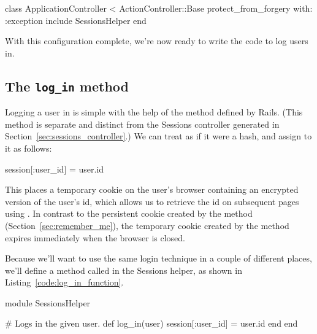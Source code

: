 \begin{codelisting}
\label{code:sessions_helper_include}
\begin{code}
class ApplicationController < ActionController::Base
  protect_from_forgery with: :exception
  include SessionsHelper
end
\end{code}
\end{codelisting}

\noindent With this configuration complete, we're now ready to write the code to log users in.


    \subsection{The \texttt{log\_in} method} %
    \label{sec:a_working_log_in_method}

Logging a user in is simple with the help of the  method defined by Rails. (This method is separate and distinct from the Sessions controller generated in Section~\ref{sec:sessions_controller}.) We can treat  as if it were a hash, and assign to it as follows:

\begin{code}
session[:user_id] = user.id
\end{code}

\noindent This places a temporary cookie on the user's browser containing an encrypted version of the user's id, which allows us to retrieve the id on subsequent pages using . In contrast to the persistent cookie created by the  method (Section~\ref{sec:remember_me}), the temporary cookie created by the  method expires immediately when the browser is closed.

Because we'll want to use the same login technique in a couple of different places, we'll define a method called  in the Sessions helper, as shown in Listing~\ref{code:log_in_function}.

\begin{codelisting}
\label{code:log_in_function}
\begin{code}
module SessionsHelper

  # Logs in the given user.
  def log_in(user)
    session[:user_id] = user.id
  end
end
\end{code}
\end{codelisting}

